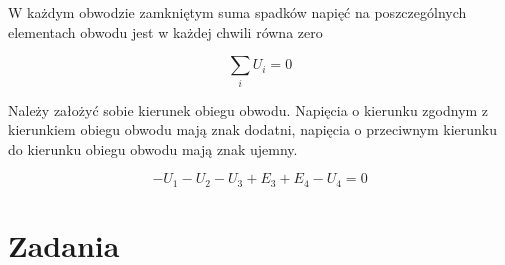 W każdym obwodzie zamkniętym suma spadków napięć na poszczególnych elementach obwodu jest w każdej chwili równa zero

\begin{equation}
\sum_{i}U_i=0
\end{equation}

Należy założyć sobie kierunek obiegu obwodu. Napięcia o kierunku zgodnym z kierunkiem obiegu obwodu mają znak dodatni, napięcia o przeciwnym kierunku do kierunku obiegu obwodu mają znak ujemny. 

\begin{equation}
-U_1-U_2-U_3+E_3+E_4-U_4=0
\end{equation}

\section{Zadania}




































